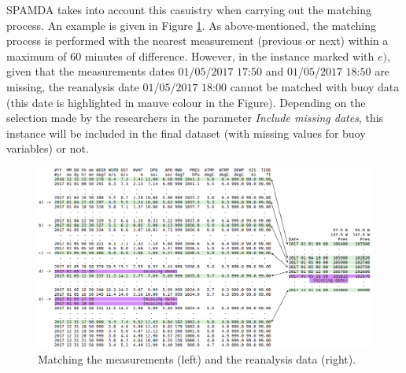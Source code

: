 \documentclass[energies,article,submit,moreauthors,pdftex]{Definitions/mdpi}
\begin{document}
		SPAMDA takes into account this casuistry when carrying out the matching process. An example is given in Figure \ref{fig:matchingMeasurements}. As above-mentioned, the matching process is performed with the nearest measurement (previous or next) within a maximum of 60 minutes of difference. However, in the instance marked with $e)$, given that the measurements dates $01$/$05$/$2017$ $17$:$50$ and $01$/$05$/$2017$ $18$:$50$ are missing, the reanalysis date $01$/$05$/$2017$ $18$:$00$ cannot be matched with buoy data (this date is highlighted in mauve colour in the Figure). Depending on the selection made by the researchers in the parameter \textit{Include missing dates}, this instance will be included in the final dataset (with missing values for buoy variables) or not.
		
		\begin{figure}[H]
			\centering
			\includegraphics[scale=0.36]{figures/FigureMatchingMeasurements.png}
			\caption{Matching the measurements (left) and the reanalysis data (right).}
			\label{fig:matchingMeasurements}
		\end{figure}




\end{document}
